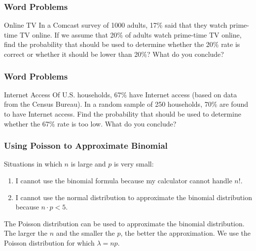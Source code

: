 \documentclass[xcolor=dvipsnames]{beamer}
\begin{document}
\begin{frame}
  \frametitle{Word Problems}
  {\ubung} Online TV In a Comcast survey of 1000 adults, 17\% said
  that they watch prime-time TV online. If we assume that 20\% of
  adults watch prime-time TV online, find the probability that should
  be used to determine whether the 20\% rate is correct or whether it
  should be lower than 20\%? What do you conclude?
\end{frame}

\begin{frame}
  \frametitle{Word Problems}
  {\ubung} Internet Access Of U.S. households, 67\% have Internet
  access (based on data from the Census Bureau). In a random sample of
  250 households, 70\% are found to have Internet access. Find the
  probability that should be used to determine whether the 67\% rate
  is too low. What do you conclude?
\end{frame}



\begin{frame}
  \frametitle{Using Poisson to Approximate Binomial}
  Situations in which $n$ is large and $p$ is very small:
  \begin{enumerate}
  \item I cannot use the binomial formula because my calculator cannot
    handle $n!$.
  \item I cannot use the normal distribution to approximate the
    binomial distribution because $n\cdot{}p<5$.
  \end{enumerate}
  The Poisson distribution can be used to approximate the binomial
  distribution. The larger the $n$ and the smaller the $p$, the better
  the approximation. We use the Poisson distribution for which
  $\lambda=np$.
\end{frame}
\end{document}

